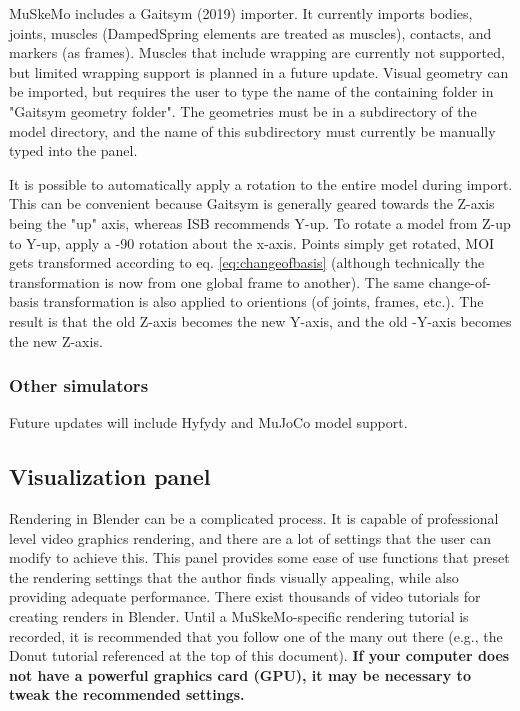 \documentclass{article}
\begin{document}
MuSkeMo includes a Gaitsym (2019) importer. It currently imports bodies, joints, muscles (DampedSpring elements are treated as muscles), contacts, and markers (as frames). Muscles that include wrapping are currently not supported, but limited wrapping support is planned in a future update. Visual geometry can be imported, but requires the user to type the name of the containing folder in "Gaitsym geometry folder". The geometries must be in a subdirectory of the model directory, and the name of this subdirectory must currently be manually typed into the panel.

It is possible to automatically apply a rotation to the entire model during import. This can be convenient because Gaitsym is generally geared towards the Z-axis being the "up" axis, whereas ISB recommends Y-up. To rotate a model from Z-up to Y-up, apply a -90 \degree rotation about the x-axis. Points simply get rotated, MOI gets transformed according to eq. \ref{eq:changeofbasis} (although technically the transformation is now from one global frame to another). The same change-of-basis transformation is also applied to orientions (of joints, frames, etc.). The result is that the old Z-axis becomes the new Y-axis, and the old -Y-axis becomes the new Z-axis.

\subsubsection{Other simulators}

Future updates will include Hyfydy and MuJoCo model support.


\subsection{Visualization panel}
\label{sec:visualizationpanel}
Rendering in Blender can be a complicated process. It is capable of professional level video graphics rendering, and there are a lot of settings that the user can modify to achieve this. This panel provides some ease of use functions that preset the rendering settings that the author finds visually appealing, while also providing adequate performance. There exist thousands of video tutorials for creating renders in Blender. Until a MuSkeMo-specific rendering tutorial is recorded, it is recommended that you follow one of the many out there (e.g., the Donut tutorial referenced at the top of this document). \textbf{If your computer does not have a powerful graphics card (GPU), it may be necessary to tweak the recommended settings.} 
\end{document}
